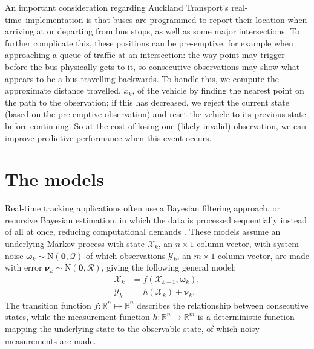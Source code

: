 \documentclass[times, doublespace]{anzsauth}
\newcommand{\rt}{real-time\ }
\begin{document}
An important consideration regarding Auckland Transport's \rt implementation is that
buses are programmed to report their location when arriving at or departing from
bus stops, as well as some major intersections.
To further complicate this,
these positions can be pre-emptive,
for example when approaching a queue of traffic at an intersection:
the way-point may trigger before the bus physically gets to it,
so consecutive observations may show what appears to be a bus travelling backwards.
To handle this, we compute the approximate distance travelled, $\tilde x_k$,
of the vehicle by finding the nearest point on the path to the observation;
if this has decreased, we reject the current state (based on the pre-emptive observation)
and reset the vehicle
to its previous state before continuing.
So at the cost of losing one (likely invalid) observation,
we can improve predictive performance
when this event occurs.


\section{The models}
\label{sec:models}

Real-time tracking applications often use
a Bayesian filtering approach,
or recursive Bayesian estimation,
in which the data is processed sequentially instead of all at once,
reducing computational demands
\citep{Anderson_2012}.
These models assume an underlying Markov process with state $\boldsymbol{\mathcal{X}}_k$,
an $n\times1$ column vector,
with system noise $\boldsymbol{\omega}_k\sim\mathrm{N}(\boldsymbol{0},\mathcal{Q})$
of which observations $\boldsymbol{\mathcal{Y}}_k$,
an $m\times1$ column vector, are made
with error $\boldsymbol{\nu}_k\sim\mathrm{N}(\boldsymbol{0},\mathcal{R})$,
giving the following general model:
\begin{equation}
\label{eq:rbe_model}
\begin{split}
\boldsymbol{\mathcal{X}}_k &= f(\boldsymbol{\mathcal{X}}_{k-1}, \boldsymbol{\omega}_k), \\
\boldsymbol{\mathcal{Y}}_k &= h(\boldsymbol{\mathcal{X}}_k) + \boldsymbol{\nu}_k.
\end{split}
\end{equation}
The transition function $f:\mathbb{R}^n\mapsto\mathbb{R}^n$
describes the relationship between consecutive states,
while the measurement function $h:\mathbb{R}^n\mapsto\mathbb{R}^m$ is a deterministic function
mapping the underlying state to the observable state,
of which noisy measurements are made.
\end{document}
